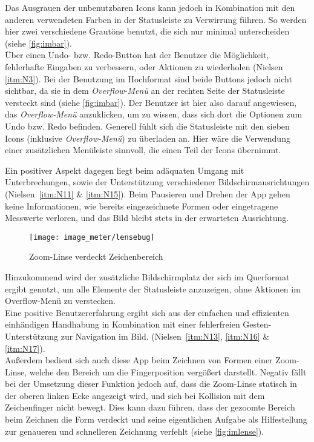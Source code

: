 Das Ausgrauen der unbenutzbaren Icons kann jedoch in Kombination mit den anderen verwendeten Farben in der Statusleiste zu Verwirrung führen.
So werden hier zwei verschiedene Grautöne benutzt, die sich nur minimal unterscheiden (siehe \autoref{fig:imbar}). 
 \\

Über einen Undo- bzw. Redo-Button hat der Benutzer die Möglichkeit, fehlerhafte Eingaben zu verbessern, oder Aktionen zu wiederholen (Nielsen \autoref{itm:N3}).
Bei der Benutzung im Hochformat sind beide Buttons jedoch nicht sichtbar, da sie in dem \emph{Overflow-Menü} an der rechten Seite der Statusleiste versteckt sind (siehe \autoref{fig:imbar}).
Der Benutzer ist hier also darauf angewiesen, das \emph{Overflow-Menü} anzuklicken, um zu wissen, dass sich dort die Optionen zum Undo bzw. Redo befinden.
Generell fühlt sich die Statusleiste mit den sieben Icons (inklusive \emph{Overflow-Menü}) zu überladen an.
Hier wäre die Verwendung einer zusätzlichen Menüleiste sinnvoll, die einen Teil der Icons übernimmt. \\

Ein positiver Aspekt dagegen liegt beim adäquaten Umgang mit Unterbrechungen, sowie der Unterstützung verschiedener Bildschirmausrichtungen (Nielsen~\autoref{itm:N11} \& \autoref{itm:N15}).
Beim Pausieren und Drehen der App gehen keine Informationen, wie bereits eingezeichnete Formen oder eingetragene Messwerte verloren, und das Bild bleibt stets in der erwarteten Ausrichtung. 

\begin{wrapfigure}{R}{0.5\textwidth}
  \centering
  \texttt{[image: image\_meter/lensebug]}
  \caption{Zoom-Linse verdeckt Zeichenbereich}
  \label{fig:imlense}
\end{wrapfigure}

Hinzukommend wird der zusätzliche Bildschirmplatz der sich im Querformat ergibt genutzt, um alle Elemente der Statusleiste anzuzeigen, ohne Aktionen im Overflow-Menü zu verstecken. \\

Eine positive Benutzererfahrung ergibt sich aus der einfachen und effizienten einhändigen Handhabung in Kombination mit einer fehlerfreien Gesten-Unterstützung zur Navigation im Bild. (Nielsen~\autoref{itm:N13}, \autoref{itm:N16} \& \autoref{itm:N17}). \\

Außerdem bedient sich auch diese App beim Zeichnen von Formen einer Zoom-Linse, welche den Bereich um die Fingerposition vergößert darstellt.
Negativ fällt bei der Umsetzung dieser Funktion jedoch auf, dass die Zoom-Linse statisch in der oberen linken Ecke angezeigt wird, und sich bei Kollision mit dem Zeichenfinger nicht bewegt.
Dies kann dazu führen, dass der gezoomte Bereich beim Zeichnen die Form verdeckt und seine eigentlichen Aufgabe als Hilfestellung zur genaueren und schnelleren Zeichnung verfehlt (siehe \autoref{fig:imlense}). \\


